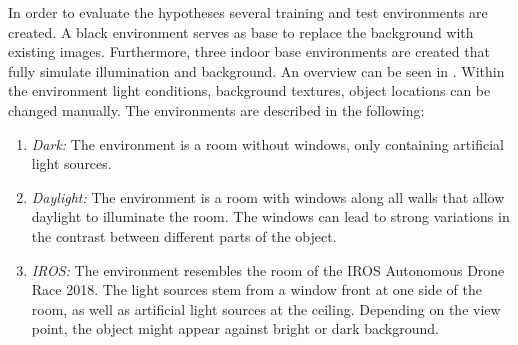 In order to evaluate the hypotheses several training and test environments are created. A black environment serves as base to replace the background with existing images. Furthermore, three indoor base environments are created that fully simulate illumination and background. An overview can be seen in . Within the environment light conditions, background textures, object locations can be changed manually. The environments are described in the following:

\begin{enumerate}
	\item \textit{Dark:} The environment is a room without windows, only containing artificial light sources. 
	\item \textit{Daylight:} The environment is a room with windows along all walls that allow daylight to illuminate the room. The windows can lead to strong variations in the contrast between different parts of the object.
	\item \textit{IROS:} The environment resembles the room of the \ac{IROS} Autonomous Drone Race 2018. The light sources stem from a window front at one side of the room, as well as artificial light sources at the ceiling. Depending on the view point, the object might appear against bright or dark background.
\end{enumerate}

